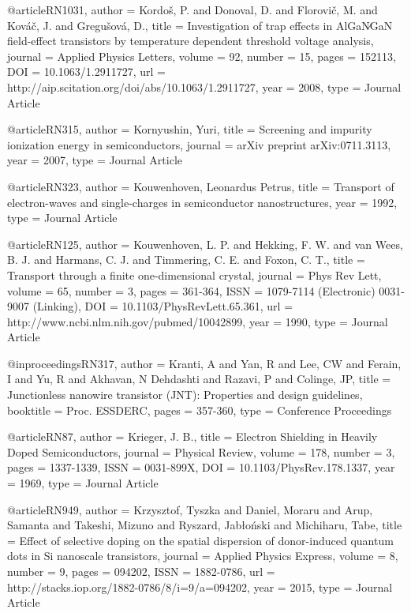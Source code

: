 @article{RN1031,
   author = {Kordoš, P. and Donoval, D. and Florovič, M. and Kováč, J. and Gregušová, D.},
   title = {Investigation of trap effects in AlGaN∕GaN field-effect transistors by temperature dependent threshold voltage analysis},
   journal = {Applied Physics Letters},
   volume = {92},
   number = {15},
   pages = {152113},
   DOI = {10.1063/1.2911727},
   url = {http://aip.scitation.org/doi/abs/10.1063/1.2911727},
   year = {2008},
   type = {Journal Article}
}

@article{RN315,
   author = {Kornyushin, Yuri},
   title = {Screening and impurity ionization energy in semiconductors},
   journal = {arXiv preprint arXiv:0711.3113},
   year = {2007},
   type = {Journal Article}
}

@article{RN323,
   author = {Kouwenhoven, Leonardus Petrus},
   title = {Transport of electron-waves and single-charges in semiconductor nanostructures},
   year = {1992},
   type = {Journal Article}
}

@article{RN125,
   author = {Kouwenhoven, L. P. and Hekking, F. W. and van Wees, B. J. and Harmans, C. J. and Timmering, C. E. and Foxon, C. T.},
   title = {Transport through a finite one-dimensional crystal},
   journal = {Phys Rev Lett},
   volume = {65},
   number = {3},
   pages = {361-364},
   ISSN = {1079-7114 (Electronic)
0031-9007 (Linking)},
   DOI = {10.1103/PhysRevLett.65.361},
   url = {http://www.ncbi.nlm.nih.gov/pubmed/10042899},
   year = {1990},
   type = {Journal Article}
}

@inproceedings{RN317,
   author = {Kranti, A and Yan, R and Lee, CW and Ferain, I and Yu, R and Akhavan, N Dehdashti and Razavi, P and Colinge, JP},
   title = {Junctionless nanowire transistor (JNT): Properties and design guidelines},
   booktitle = {Proc. ESSDERC},
   pages = {357-360},
   type = {Conference Proceedings}
}

@article{RN87,
   author = {Krieger, J. B.},
   title = {Electron Shielding in Heavily Doped Semiconductors},
   journal = {Physical Review},
   volume = {178},
   number = {3},
   pages = {1337-1339},
   ISSN = {0031-899X},
   DOI = {10.1103/PhysRev.178.1337},
   year = {1969},
   type = {Journal Article}
}

@article{RN949,
   author = {Krzysztof, Tyszka and Daniel, Moraru and Arup, Samanta and Takeshi, Mizuno and Ryszard, Jabłoński and Michiharu, Tabe},
   title = {Effect of selective doping on the spatial dispersion of donor-induced quantum dots in Si nanoscale transistors},
   journal = {Applied Physics Express},
   volume = {8},
   number = {9},
   pages = {094202},
   ISSN = {1882-0786},
   url = {http://stacks.iop.org/1882-0786/8/i=9/a=094202},
   year = {2015},
   type = {Journal Article}
}

